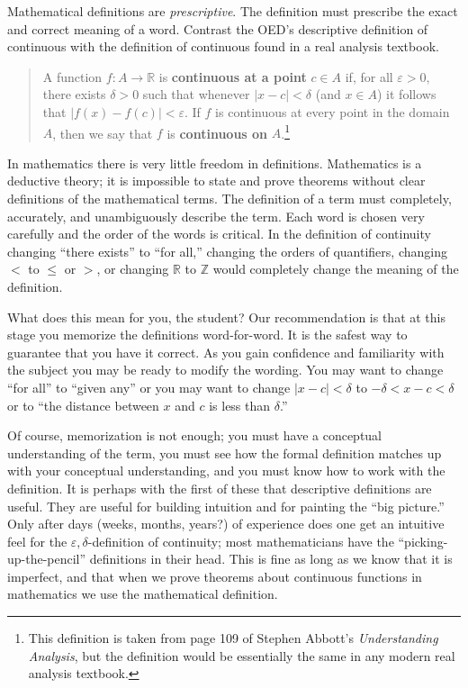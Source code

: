 Mathematical definitions are \emph{prescriptive}. The definition must prescribe the exact and correct meaning  of a word. Contrast the OED's descriptive definition of continuous with the definition of continuous found in a real analysis textbook.
\begin{quote}
A function $f:A\to \mathbb{R}$ is \textbf{continuous at a point} $c\in A$ if,  for all $\varepsilon>0$, there exists $\delta>0$ such that whenever $|x-c|<\delta$ (and $x\in A$) it follows that $|f(x)-f(c)|<\varepsilon$. If $f$ is continuous at every point in the domain $A$, then we say that $f$ is \textbf{continuous on} $A$.\footnote{This definition is taken from page 109 of Stephen Abbott's \emph{Understanding Analysis}, but the definition would be essentially the same in any modern real analysis textbook.} 
\end{quote}
In mathematics there is very little freedom in definitions. Mathematics is a deductive theory; it is impossible to state and prove theorems without clear definitions of the mathematical terms. The definition of a term must completely, accurately, and unambiguously describe the term. Each word is chosen very carefully and the order of the words is  critical. In the definition of continuity changing ``there exists'' to ``for all,'' changing the orders of quantifiers, changing $<$ to $\leq$ or $>$, or changing $\mathbb{R}$ to $\mathbb{Z}$ would completely change the meaning of the definition. 

What does this mean for you, the student? Our recommendation is that at this stage you memorize the definitions word-for-word. It is the safest way to guarantee that you have it correct. As you gain confidence and familiarity with the subject you may be ready to modify the wording. You may want to change ``for all'' to ``given any'' or you may want to change $|x-c|<\delta$ to $-\delta<x-c<\delta$ or to ``the distance between $x$ and $c$ is less than $\delta$.'' 

Of course, memorization is not enough; you must have a conceptual understanding of the term, you must see how the formal definition matches up with your conceptual understanding, and you must know how to work with the definition. It is perhaps with the first of these that descriptive definitions are useful. They are useful for building intuition and for painting the ``big picture.'' Only after days (weeks, months, years?) of experience does one get an intuitive feel for the $\varepsilon,\delta$-definition of continuity; most mathematicians have the ``picking-up-the-pencil'' definitions in their head. This is fine as long as we know that it is imperfect, and that when we prove theorems about continuous functions in mathematics we use the mathematical definition. 

